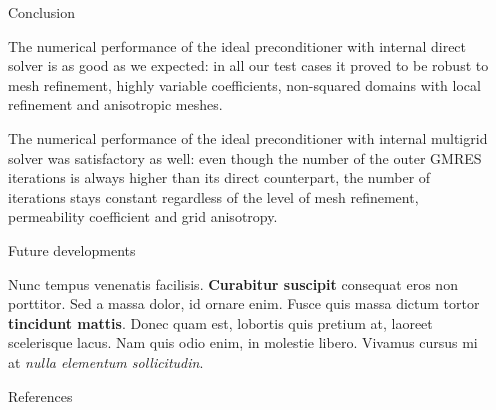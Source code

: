 \documentclass[final]{beamer}
\newlength{\sepwid}
\newlength{\onecolwid}
\begin{document}
\begin{frame}[t]
\begin{columns}[t]
\begin{column}{\sepwid}\end{column} %

\begin{column}{\onecolwid} %


\begin{block}{Conclusion}

The numerical performance of the ideal preconditioner with internal direct
solver is as good as we expected: in all our test cases it proved to be robust
to mesh refinement, highly variable coefficients, non-squared domains with
local refinement and anisotropic meshes.

The numerical performance of the ideal preconditioner with internal
multigrid solver was satisfactory as well: even though the number of the outer
GMRES iterations is always higher than its direct counterpart, the number of
iterations stays constant regardless of the level of mesh refinement,
permeability coefficient and grid anisotropy.

\end{block}

\begin{block}{Future developments}

Nunc tempus venenatis facilisis. \textbf{Curabitur suscipit} consequat eros non
porttitor. Sed a massa dolor, id ornare enim. Fusce quis massa dictum tortor
\textbf{tincidunt mattis}. Donec quam est, lobortis quis pretium at, laoreet
scelerisque lacus. Nam quis odio enim, in molestie libero. Vivamus cursus mi at
\textit{nulla elementum sollicitudin}.

\end{block}


\begin{block}{References}

\nocite{*} %
\small{
\vspace{0.75in}}


\end{block}
\end{column}
\end{columns}
\end{frame}
\end{document}
